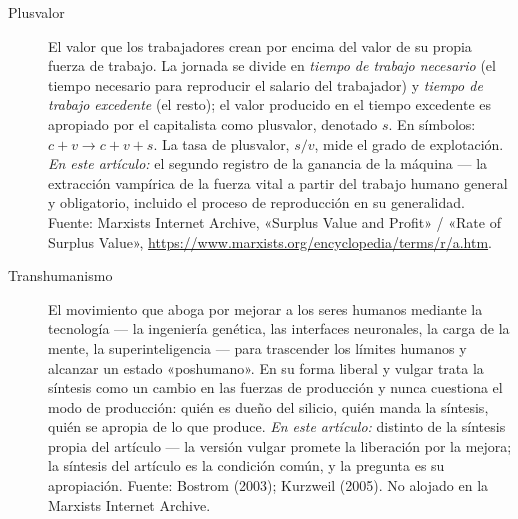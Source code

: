 \documentclass[11pt]{article}
\begin{document}
\begin{description}
\item[Plusvalor] El valor que los trabajadores crean por encima del valor
de su propia fuerza de trabajo. La jornada se divide en \emph{tiempo
de trabajo necesario} (el tiempo necesario para reproducir el salario
del trabajador) y \emph{tiempo de trabajo excedente} (el resto); el
valor producido en el tiempo excedente es apropiado por el capitalista
como plusvalor, denotado $s$. En símbolos: $c + v \to c + v + s$. La
tasa de plusvalor, $s/v$, mide el grado de explotación. \emph{En este
artículo:} el segundo registro de la ganancia de la máquina --- la
extracción vampírica de la fuerza vital a partir del trabajo humano
general y obligatorio, incluido el proceso de reproducción en su
generalidad. Fuente: Marxists Internet Archive, «Surplus Value and
Profit» / «Rate of Surplus Value»,
\url{https://www.marxists.org/encyclopedia/terms/r/a.htm}.

\item[Transhumanismo] El movimiento que aboga por mejorar a los seres
humanos mediante la tecnología --- la ingeniería genética, las
interfaces neuronales, la carga de la mente, la superinteligencia ---
para trascender los límites humanos y alcanzar un estado «poshumano».
En su forma liberal y vulgar trata la síntesis como un cambio en las
fuerzas de producción y nunca cuestiona el modo de producción: quién es
dueño del silicio, quién manda la síntesis, quién se apropia de lo que
produce. \emph{En este artículo:} distinto de la síntesis propia del
artículo --- la versión vulgar promete la liberación por la mejora; la
síntesis del artículo es la condición común, y la pregunta es su
apropiación. Fuente: Bostrom (2003); Kurzweil (2005). No alojado en la
Marxists Internet Archive.
\end{description}
\end{document}
